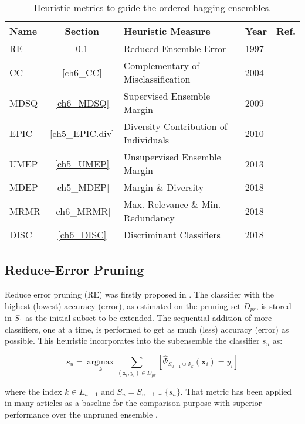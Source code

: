 \begin{table}[!ht]
 \centering \scriptsize
 \caption{Heuristic metrics to guide the ordered bagging ensembles.}
\label{metrics}
\begin{tabular}{l|c|l|l|l}
\hline
Name & Section &Heuristic Measure & Year & Ref.\\ \hline
RE & \ref{ch6_RE} & Reduced Ensemble Error & 1997 & \cite{margineantu1997} \\
CC & \ref{ch6_CC} & Complementary of Misclassification & 2004 & \cite{martinez2004}\\
MDSQ  & \ref{ch6_MDSQ} & Supervised Ensemble Margin & 2009 & \cite{martinez2009}\\
EPIC & \ref{ch5_EPIC.div} &Diversity Contribution of Individuals & 2010 & \cite{lu2010}\\
UMEP & \ref{ch5_UMEP} &Unsupervised Ensemble Margin & 2013 & \cite{guo2013}\\
MDEP &\ref{ch5_MDEP} &Margin \& Diversity & 2018 & \cite{guo2018}\\
MRMR & \ref{ch6_MRMR} &Max. Relevance \&  Min. Redundancy & 2018 & \cite{cao2018}\\
DISC &\ref{ch6_DISC} &Discriminant Classifiers & 2018 & \cite{cao2018}\\
\hline
\end{tabular}
\end{table}     


\subsection{Reduce-Error Pruning} \label{ch6_RE}
Reduce error pruning (RE) was firstly proposed in \cite{margineantu1997}. The classifier with the highest (lowest) accuracy (error), as estimated on the pruning set $D_{pr}$, is stored in $S_1$ as the initial subset to be extended. The sequential addition of more classifiers, one at a time, is performed to get as much (less) accuracy (error) as possible. This heuristic incorporates into the subensemble the classifier $s_u$ as:  

\begin{equation}
\label{Reduced.err}
s_u=\mathop{\arg\max}\limits_{k} \mathop{\sum}\limits_{(\textbf{x}_i,y_i) \in D_{pr}} \left[\hat{\Psi}_{S_{u-1}\cup \Psi_k} (\textbf{x}_i) =y_i\right] 
\end{equation}

\noindent where the index $k \in L_{u-1}$ and $S_u=S_{u-1} \cup \{s_u\}$. That metric has been applied in many articles as a baseline for the comparison purpose \cite{cao2018,guo2013} with superior performance over the unpruned ensemble \cite{martinez2009}.


